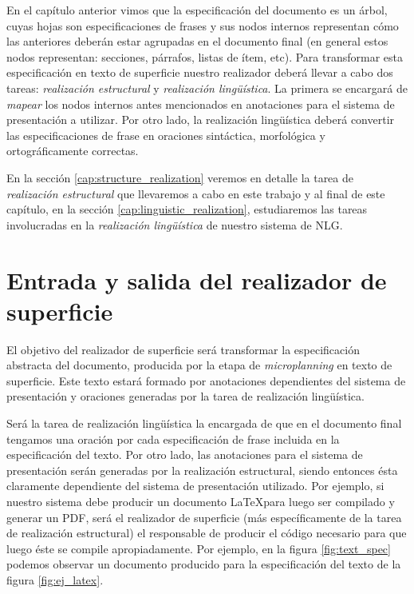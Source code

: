 En el capítulo anterior vimos que la especificación del documento es un árbol, cuyas hojas son especificaciones de frases y sus nodos internos representan cómo las anteriores deberán estar agrupadas en el documento final (en general estos nodos representan: secciones, párrafos, listas de ítem, etc). Para transformar esta especificación en texto de superficie nuestro realizador deberá llevar a cabo dos tareas: \emph{realización estructural} y \emph{realización lingüística}. La primera se encargará de \emph{mapear} los nodos internos antes mencionados en anotaciones para el sistema de presentación a utilizar. Por otro lado, la realización lingüística deberá convertir las especificaciones de frase en oraciones sintáctica, morfológica y ortográficamente correctas.

En la sección \ref{cap:structure_realization} veremos en detalle la tarea de \emph{realización estructural} que llevaremos a cabo en este trabajo y al final de este capítulo, en la sección \ref{cap:linguistic_realization}, estudiaremos las tareas involucradas en la \emph{realización lingüística} de nuestro sistema de NLG.

\section{Entrada y salida del realizador de superficie}

El objetivo del realizador de superficie será transformar la especificación abstracta del documento, producida por la etapa de \textit{microplanning} en texto de superficie. Este texto estará formado por anotaciones dependientes del sistema de presentación y oraciones generadas por la tarea de realización lingüística.

Será la tarea de realización lingüística la encargada de que en el documento final tengamos una oración por cada especificación de frase incluida en la especificación del texto. Por otro lado, las anotaciones para el sistema de presentación serán generadas por la realización estructural, siendo entonces ésta claramente dependiente del sistema de presentación utilizado. Por ejemplo, si nuestro sistema debe producir un documento \LaTeX para luego ser compilado y generar un PDF, será el realizador de superficie (más específicamente de la tarea de realización estructural) el responsable de producir el código necesario para que luego éste se compile apropiadamente. Por ejemplo, en la figura \ref{fig:text_spec} podemos observar un documento producido para la especificación del texto de la figura \ref{fig:ej_latex}.

